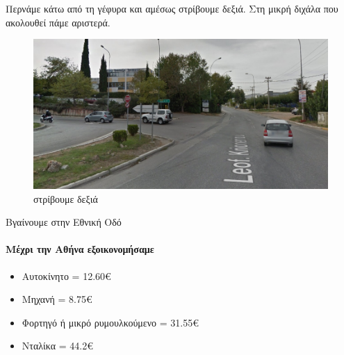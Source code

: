Περνάμε κάτω από τη γέφυρα και αμέσως στρίβουμε δεξιά. Στη μικρή διχάλα που ακολουθεί πάμε αριστερά.
\begin{figure}[H]
\includegraphics[width=\textwidth]{images/lamia-athina/afidnon/afidnon_028.jpg} 
\caption{στρίβουμε δεξιά}
\end{figure}
Βγαίνουμε στην Εθνική Οδό
\vspace{12pt}
\paragraph{Μέχρι την Αθήνα εξοικονομήσαμε}
\begin{itemize}
\item Αυτοκίνητο = 12.60€
\item Μηχανή = 8.75€
\item Φορτηγό ή μικρό ρυμουλκούμενο = 31.55€
\item Νταλίκα = 44.2€
\end{itemize}
